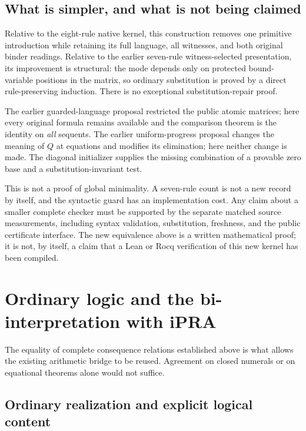 \documentclass[11pt]{article}
\theoremstyle{definition}
\theoremstyle{remark}
\begin{document}
\subsection{What is simpler, and what is not being claimed}

Relative to the eight-rule native kernel, this construction removes one
primitive introduction while retaining its full language, all witnesses,
and both original binder readings.  Relative to the earlier seven-rule
witness-selected presentation, its improvement is structural: the mode
depends only on protected bound-variable positions in the matrix, so
ordinary substitution is proved by a direct rule-preserving induction.
There is no exceptional substitution-repair proof.

The earlier guarded-language proposal restricted the public atomic
matrices; here every original formula remains available and the comparison
theorem is the identity on \emph{all} sequents.  The earlier
uniform-progress proposal changes the meaning of $Q$ at equations and
modifies its elimination; here neither change is made.  The diagonal
initializer supplies the missing combination of a provable zero base and
a substitution-invariant test.

This is not a proof of global minimality.  A seven-rule count is not a
new record by itself, and the syntactic guard has an implementation cost.
Any claim about a smaller complete checker must be supported by the
separate matched source measurements, including syntax validation,
substitution, freshness, and the public certificate interface.
The new equivalence above is a written mathematical proof; it is not, by
itself, a claim that a Lean or Rocq verification of this new kernel has
been compiled.


\section{Ordinary logic and the bi-interpretation with iPRA}
\label{sec:interpretation}

The equality of complete consequence relations established above is what
allows the existing arithmetic bridge to be reused. Agreement on closed
numerals or on equational theorems alone would not suffice.

\subsection{Ordinary realization and explicit logical content}
\end{document}
